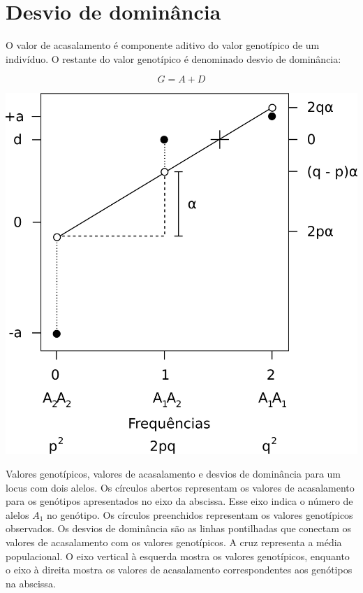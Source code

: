 \documentclass[portuges,]{tufte-handout}
\begin{document}
\section{Desvio de dominância}\label{desvio-de-dominuxe2ncia}

O valor de acasalamento é componente aditivo do valor genotípico de um
indivíduo. O restante do valor genotípico é denominado desvio de
dominância:

\[
G = A + D
\]

\begin{marginfigure}
\includegraphics{./figuras/desviodominancia.png}
\caption{Valores genotípicos, valores de acasalamento e desvios
de dominância para um locus com dois alelos. Os círculos abertos
representam os valores de acasalamento para os genótipos apresentados no
eixo da abscissa. Esse eixo indica o número de alelos \(A_1\) no
genótipo. Os círculos preenchidos representam os valores genotípicos
observados. Os desvios de dominância são as linhas pontilhadas que
conectam os valores de acasalamento com os valores genotípicos. A cruz
representa a média populacional. O eixo vertical à esquerda mostra os
valores genotípicos, enquanto o eixo à direita mostra os valores de
acasalamento correspondentes aos genótipos na abscissa.}
\label{desviodominancia}
\end{marginfigure}
\end{document}

